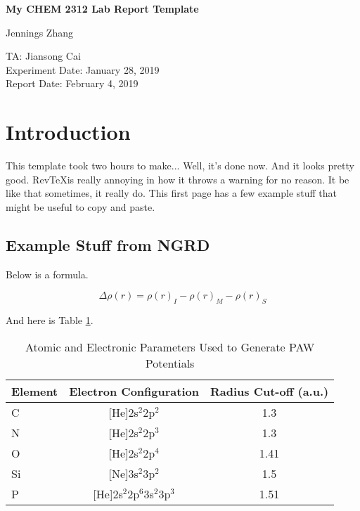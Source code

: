 \documentclass[letterpaper,amsmath,amssymb,prb,preprint,12pt]{revtex4-1}%
\begin{document}
\setcounter{page}{0}
\raggedbottom


\begin{titlepage}
\begin{center}

\vspace*{6cm}
\Large
\textbf{My CHEM 2312 Lab Report Template}

\vspace{0.5cm}
\large
Jennings Zhang
\vspace{1.5cm}

TA: Jiansong Cai\\
Experiment Date: January 28, 2019\\
Report Date: February 4, 2019

\end{center}
\thispagestyle{empty} %
\end{titlepage}


\section{Introduction}

This template took two hours to make... Well, it's done now. And it looks pretty good. Rev\TeX is really annoying in how it throws a warning for no reason. It be like that sometimes, it really do. This first page has a few example stuff that might be useful to copy and paste.

\subsection{Example Stuff from NGRD}

Below is a formula.

\[\Delta\rho(r)=\rho(r)_{I}-\rho(r)_{M}-\rho(r)_{S}\]

And here is Table \ref{paw}.

\begin{table}[h]
\caption{Atomic and Electronic Parameters Used to Generate PAW Potentials}
\begin{tabular}{l@{\hskip 1cm}c@{\hskip 1cm}c}
\hline
Element&Electron Configuration&Radius Cut-off (a.u.)\\
\hline
\hline
C & [He]2s$^{2}$2p$^{2}$ & 1.3 \\
N & [He]2s$^{2}$2p$^{3}$ & 1.3 \\
O & [He]2s$^{2}$2p$^{4}$ & 1.41 \\
Si & [Ne]3s$^{2}$3p$^{2}$ & 1.5 \\
P & [He]2s$^{2}$2p$^{6}$3s$^{2}$3p$^{3}$ & 1.51 \\
\hline
\end{tabular}
\label{paw}
\end{table}
\end{document}
